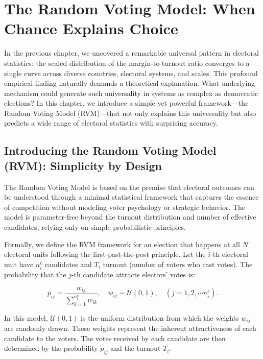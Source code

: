 \chapter{The Random Voting Model: When Chance Explains Choice}
\label{chap5}

In the previous chapter, we uncovered a remarkable universal pattern in electoral statistics: the scaled distribution of the margin-to-turnout ratio converges to a single curve across diverse countries, electoral systems, and scales. This profound empirical finding naturally demands a theoretical explanation. What underlying mechanism could generate such universality in systems as complex as democratic elections? In this chapter, we introduce a simple yet powerful framework—the Random Voting Model (RVM)—that not only explains this universality but also predicts a wide range of electoral statistics with surprising accuracy.

\section{Introducing the Random Voting Model (RVM): Simplicity by Design}

The Random Voting Model is based on the premise that electoral outcomes can be understood through a minimal statistical framework that captures the essence of competition without modeling voter psychology or strategic behavior. The model is parameter-free beyond the turnout distribution and number of effective candidates, relying only on simple probabilistic principles.

Formally, we define the RVM framework for an election that happens at all $N$ electoral units following the first-past-the-post principle. Let the $i$-th electoral unit have $n^c_i$ candidates and $T_i$ turnout (number of voters who cast votes). The probability that the $j$-th candidate attracts electors' votes is:

\begin{equation}
    p_{ij} = \frac{w_{ij}}{\sum_{k=1}^{n^c_i} w_{ik}}, \quad w_{ij} \sim \mathcal{U}(0, 1), \quad (j = 1, 2, \cdots n^c_i).
    \label{eq:prob}
\end{equation}

In this model, $\mathcal{U}(0, 1)$ is the uniform distribution from which the weights $w_{ij}$ are randomly drawn. These weights represent the inherent attractiveness of each candidate to the voters. The votes received by each candidate are then determined by the probability $p_{ij}$ and the turnout $T_i$.

